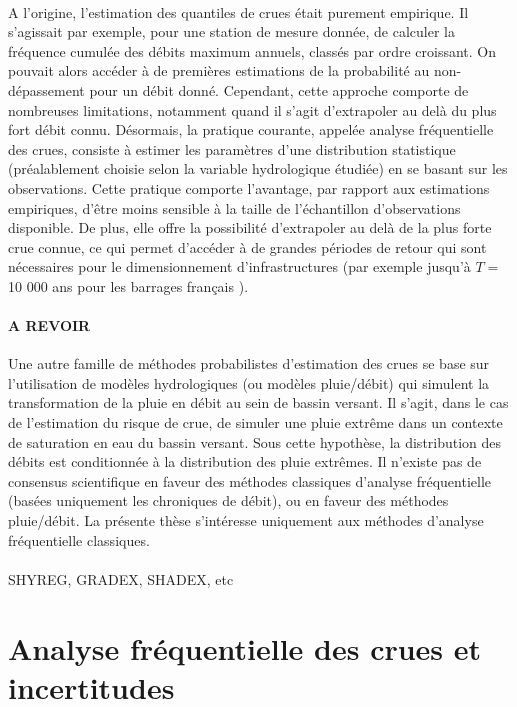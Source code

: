 \documentclass[11pt]{article}
\begin{document}
	\paragraph{} A l'origine, l'estimation des quantiles de crues était purement empirique. Il s'agissait par exemple, pour une station de mesure donnée, de calculer la fréquence cumulée des débits maximum annuels, classés par ordre croissant. On pouvait alors accéder à de premières estimations de la probabilité au non-dépassement pour un débit donné. Cependant, cette approche comporte de nombreuses limitations, notamment quand il s'agit d'extrapoler au delà du plus fort débit connu. Désormais, la pratique courante, appelée analyse fréquentielle des crues, consiste à estimer les paramètres d'une distribution statistique (préalablement choisie selon la variable hydrologique étudiée) en se basant sur les observations. Cette pratique comporte l'avantage, par rapport aux estimations empiriques, d'être moins sensible à la taille de l'échantillon d'observations disponible. De plus, elle offre la possibilité d'extrapoler au delà de la plus forte crue connue, ce qui permet d'accéder à de grandes périodes de retour qui sont nécessaires pour le dimensionnement d'infrastructures (par exemple jusqu'à $T =$ 10 000 ans pour les barrages français \citep{le_delliou_recommandations_2014}). 
	
	\paragraph{A REVOIR} Une autre famille de méthodes probabilistes d'estimation des crues se base sur l'utilisation de modèles hydrologiques (ou modèles pluie/débit) qui simulent la transformation de la pluie en débit au sein de bassin versant. Il s'agit, dans le cas de l'estimation du risque de crue, de simuler une pluie extrême dans un contexte de saturation en eau du bassin versant. Sous cette hypothèse, la distribution des débits est conditionnée à la distribution des pluie extrêmes. Il n'existe pas de consensus scientifique en faveur des méthodes classiques d'analyse fréquentielle (basées uniquement les chroniques de débit), ou en faveur des méthodes pluie/débit. La présente thèse s'intéresse uniquement aux méthodes d'analyse fréquentielle classiques.
			    \paragraph{} SHYREG, GRADEX, SHADEX, etc
		
	\section{Analyse fréquentielle des crues et incertitudes}
	
\end{document}

